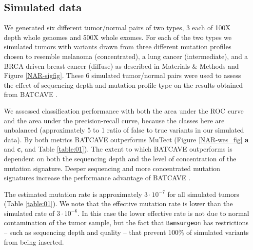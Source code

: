 \documentclass[a4,center,fleqn]{NAR}
\newcommand{\batcave}{BATCAVE }
\begin{document}
\subsection{Simulated data}
We generated six different tumor/normal pairs of two types, 3 each of 100X depth whole genomes and 500X whole exomes.
For each of the two types we simulated tumors with variants drawn from three different mutation profiles chosen to resemble melanoma (concentrated), a lung cancer (intermediate), and a BRCA-driven breast cancer (diffuse)  as described in Materials \& Methods and Figure \ref{NAR-sigfig}.
These 6 simulated tumor/normal pairs were used to assess the effect of sequencing depth and mutation profile type on the results obtained from \batcave.



We assessed classification performance with both the area under the ROC curve and the area under the precision-recall curve, because the classes here are unbalanced (approximately 5 to 1 ratio of false to true variants in our simulated data).
By both metrics \batcave outperforms MuTect (Figure \ref{NAR-wes_fig} \textbf{a} and \textbf{c}, and Table \ref{table:01}).
The extent to which \batcave outperforms is dependent on both the sequencing depth and the level of concentration of the mutation signature.
Deeper sequencing and more concentrated mutation signatures increase the performance advantage of \batcave. 

The estimated mutation rate is approximately $3\cdot10^{-7}$ for all simulated tumors (Table \ref{table:01}).
We note that the effective mutation rate is lower than the simulated rate of $3\cdot10^{-6}$.
In this case the lower effective rate is not due to normal contamination of the tumor sample, but the fact that \texttt{Bamsurgeon} has restrictions -- such as sequencing depth and quality -- that prevent 100\% of simulated variants from being inserted. 
\end{document}
